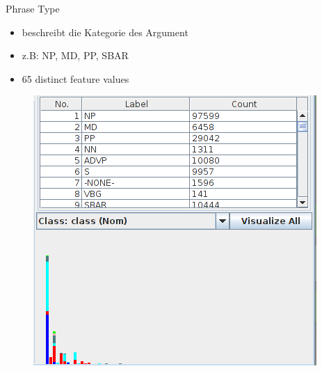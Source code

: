\documentclass[10pt]{beamer}
\begin{document}
  \begin{frame}{Phrase Type}
   \begin{itemize}
    \item beschreibt die Kategorie des Argument
    \item z.B: NP, MD, PP, SBAR
    \item 65 distinct feature values
   \end{itemize}
   
   \begin{figure}
   	\begin{center}
   		\includegraphics[scale=0.3]{phraseType}
   	\end{center}
   \end{figure}
  \end{frame}
  
\end{document}
